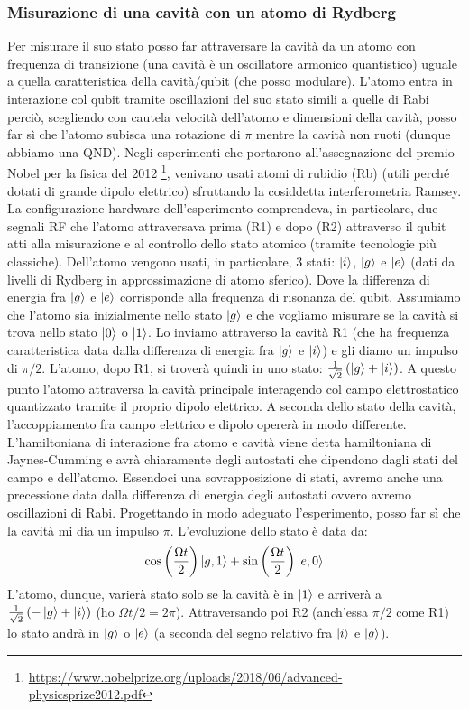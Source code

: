 \subsubsection{Misurazione di una cavità con un atomo di Rydberg}
Per misurare il suo stato posso far attraversare la cavità da un atomo con frequenza di transizione (una cavità è un oscillatore armonico quantistico) uguale a quella caratteristica della cavità/qubit (che posso modulare). L'atomo entra in interazione col qubit tramite oscillazioni del suo stato simili a quelle di Rabi perciò, scegliendo con cautela velocità dell'atomo e dimensioni della cavità, posso far sì che l'atomo subisca una rotazione di $\pi$ mentre la cavità non ruoti (dunque abbiamo una QND).
Negli esperimenti che portarono all'assegnazione del premio Nobel per la fisica del 2012 \footnote{\url{https://www.nobelprize.org/uploads/2018/06/advanced-physicsprize2012.pdf}}, venivano usati atomi di rubidio (Rb) (utili perché dotati di grande dipolo elettrico) sfruttando la cosiddetta interferometria Ramsey. La configurazione hardware dell'esperimento comprendeva, in particolare, due segnali RF che l'atomo attraversava prima (R1) e dopo (R2) attraverso il qubit atti alla misurazione e al controllo dello stato atomico (tramite tecnologie più classiche).
Dell'atomo vengono usati, in particolare, 3 stati: $\ket i$, $\ket g$ e $\ket e$ (dati da livelli di Rydberg in approssimazione di atomo sferico). Dove la differenza di energia fra $\ket g$ e $\ket e$ corrisponde alla frequenza di risonanza del qubit.
Assumiamo che l'atomo sia inizialmente nello stato $\ket g$ e che vogliamo misurare se la cavità si trova nello stato $\ket 0$ o $\ket 1$. Lo inviamo attraverso la cavità R1 (che ha frequenza caratteristica data dalla differenza di energia fra $\ket g$ e $\ket i$) e gli diamo un impulso di $\pi/2$. L'atomo, dopo R1, si troverà quindi in uno stato: $\frac{1}{\sqrt 2} \left( \ket g + \ket i \right)$. 
A questo punto l'atomo attraversa la cavità principale interagendo col campo elettrostatico quantizzato tramite il proprio dipolo elettrico. A seconda dello stato della cavità, l'accoppiamento fra campo elettrico e dipolo opererà in modo differente. L'hamiltoniana di interazione fra atomo e cavità viene detta hamiltoniana di Jaynes-Cumming e avrà chiaramente degli autostati che dipendono dagli stati del campo e dell'atomo. Essendoci una sovrapposizione di stati, avremo anche una precessione data dalla differenza di energia degli autostati ovvero avremo oscillazioni di Rabi. Progettando in modo adeguato l'esperimento, posso far sì che la cavità mi dia un impulso $\pi$. L'evoluzione dello stato è data da:
\begin{equation*}
    \cos \left( \frac{\Omega t}{2}\right) \ket{g, 1}+ \sin \left( \frac{\Omega t}{2}\right) \ket{e, 0}
\end{equation*}
L'atomo, dunque, varierà stato solo se la cavità è in $\ket 1$ e arriverà a $\frac{1}{\sqrt{2}}\left( -\ket g + \ket i \right)$ (ho $\Omega t/2=2\pi$).
Attraversando poi R2 (anch'essa $\pi/2$ come R1) lo stato andrà in $\ket g$ o $\ket e$ (a seconda del segno relativo fra $\ket i$ e $\ket g$).